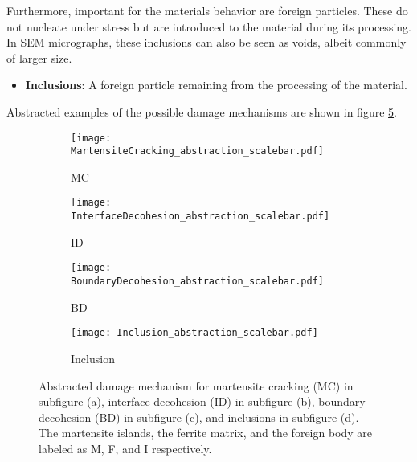 Furthermore, important for the materials behavior are foreign particles. These do not nucleate under stress but are introduced to the material during its processing. In SEM micrographs, these inclusions can also be seen as voids, albeit commonly of larger size.
\begin{itemize}[label={}]
\item \textbf{Inclusions}: A foreign particle remaining from the processing of the material. 
\end{itemize}
Abstracted examples of the possible damage mechanisms are shown in figure \ref{fig:DamageCategories_abstraction}. \\



\begin{figure}%
\begin{subfigure}{.25\textwidth}
\centering
  \texttt{[image: MartensiteCracking\_abstraction\_scalebar.pdf]}
  \caption{MC}
  \label{sub:MC}
\end{subfigure}%
\begin{subfigure}{.25\textwidth}
\centering
  \texttt{[image: InterfaceDecohesion\_abstraction\_scalebar.pdf]}
  \caption{ID}
  \label{sub:ID}
\end{subfigure}%
\centering
\begin{subfigure}{.25\textwidth}
\centering
  \texttt{[image: BoundaryDecohesion\_abstraction\_scalebar.pdf]}
  \caption{BD}
  \label{sub:BD}
\end{subfigure}%
\centering
\begin{subfigure}{.25\textwidth}
\centering
  \texttt{[image: Inclusion\_abstraction\_scalebar.pdf]}
  \caption{Inclusion}
  \label{sub:Inc}
\end{subfigure}%
\caption{Abstracted damage mechanism for martensite cracking (MC) in subfigure (a), interface decohesion (ID) in subfigure (b), boundary decohesion (BD) in subfigure (c),  and inclusions in subfigure (d). The martensite islands, the ferrite matrix, and the foreign body are labeled as M, F, and I respectively.}
\label{fig:DamageCategories_abstraction}
\end{figure}


